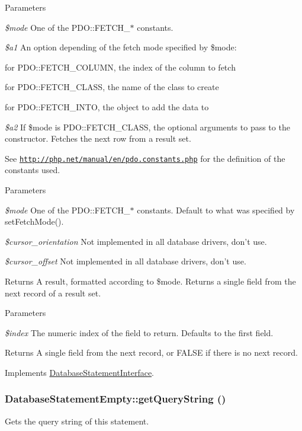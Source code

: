 \begin{DoxyParams}{Parameters}
\item[{\em \$mode}]One of the PDO::FETCH\_\-$\ast$ constants. \item[{\em \$a1}]An option depending of the fetch mode specified by \$mode:
\begin{DoxyItemize}
\item for PDO::FETCH\_\-COLUMN, the index of the column to fetch
\item for PDO::FETCH\_\-CLASS, the name of the class to create
\item for PDO::FETCH\_\-INTO, the object to add the data to 
\end{DoxyItemize}\item[{\em \$a2}]If \$mode is PDO::FETCH\_\-CLASS, the optional arguments to pass to the constructor. Fetches the next row from a result set.\end{DoxyParams}
See \href{http://php.net/manual/en/pdo.constants.php}{\tt http://php.net/manual/en/pdo.constants.php} for the definition of the constants used.


\begin{DoxyParams}{Parameters}
\item[{\em \$mode}]One of the PDO::FETCH\_\-$\ast$ constants. Default to what was specified by setFetchMode(). \item[{\em \$cursor\_\-orientation}]Not implemented in all database drivers, don't use. \item[{\em \$cursor\_\-offset}]Not implemented in all database drivers, don't use.\end{DoxyParams}
\begin{DoxyReturn}{Returns}
A result, formatted according to \$mode. Returns a single field from the next record of a result set.
\end{DoxyReturn}

\begin{DoxyParams}{Parameters}
\item[{\em \$index}]The numeric index of the field to return. Defaults to the first field.\end{DoxyParams}
\begin{DoxyReturn}{Returns}
A single field from the next record, or FALSE if there is no next record. 
\end{DoxyReturn}


Implements \hyperlink{interfaceDatabaseStatementInterface_a66325e9222c90de0fc87c201652be9e4}{DatabaseStatementInterface}.\hypertarget{classDatabaseStatementEmpty_a14114ed9aed78af3b2ff03eb40840e7d}{
\subsubsection[{getQueryString}]{\setlength{\rightskip}{0pt plus 5cm}DatabaseStatementEmpty::getQueryString ()}}
\label{classDatabaseStatementEmpty_a14114ed9aed78af3b2ff03eb40840e7d}
Gets the query string of this statement.

